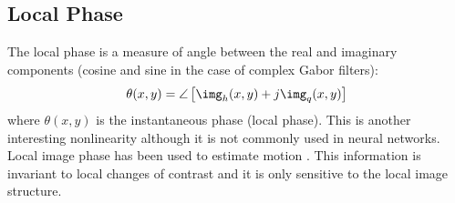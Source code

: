 %
%

\subsection{Local Phase}

The local phase is a measure of angle between the real and imaginary components (cosine and sine in the case of complex Gabor filters):
\begin{equation}
	\theta(x,y) = \angle \left[ \img_h(x,y) + j \img_q(x,y) \right]
\end{equation}
where $\theta (x,y)$ is the instantaneous phase (local phase). This is another interesting nonlinearity although it is not commonly used in neural networks. Local image phase has been used to estimate motion \cite{Fleet89}. This information is invariant to local changes of contrast and it is only sensitive to the local image structure.

